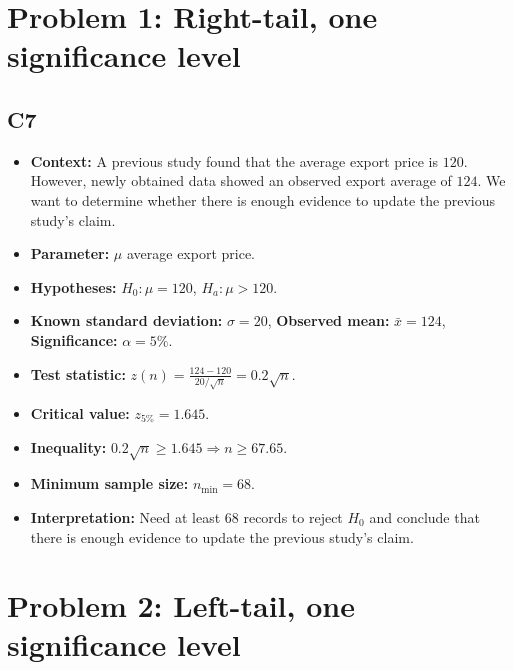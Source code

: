 \section{Problem 1: Right-tail, one significance level}
\subsection*{C7}
\begin{itemize}
	\item \textbf{Context:} A previous study found that the average export price is \(120\). However, newly obtained data showed an observed export average of \(124\). We want to determine whether there is enough evidence to update the previous study's claim.
	\item \textbf{Parameter:} \(\mu\) average export price.
	\item \textbf{Hypotheses:} \(H_0:\mu=120\), \(H_a:\mu>120\).
	\item \textbf{Known standard deviation:} \(\sigma=20\), \textbf{Observed mean:} \(\bar x=124\), \textbf{Significance:} \(\alpha=5\%\).
	\item \textbf{Test statistic:} \(z(n)=\frac{124-120}{20/\sqrt n}=0.2\sqrt n\).
	\item \textbf{Critical value:} \(z_{5\%}=1.645\).
	\item \textbf{Inequality:} \(0.2\sqrt n\ge1.645\Rightarrow n\ge67.65\).
	\item \textbf{Minimum sample size:} \(n_{\min}=68\).
	\item \textbf{Interpretation:} Need at least 68 records to reject \(H_0\) and conclude that there is enough evidence to update the previous study's claim.
\end{itemize}

\section{Problem 2: Left-tail, one significance level}
